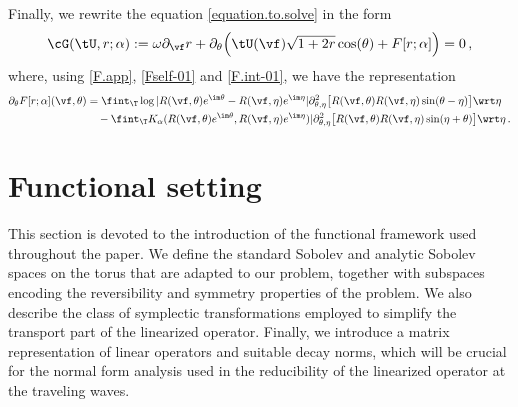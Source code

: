 \documentclass[a4paper,reqno,10pt]{article}
\newcommand{\pa}{\partial}
\begin{document}
Finally, we rewrite the equation \eqref{equation.to.solve} in the form
    \begin{align}\label{Func.G}
		\cG(\tU,r;\alpha):= \omega \pa_{\vf} r + \pa_{\theta} \Big( \tU(\vf) \sqrt{1+2 r} \cos(\theta) + F[r;\alpha] \Big)=0 \,, 
         \end{align}
         where, using \eqref{F.app}, \eqref{Fself-01} and \eqref{F.int-01}, we have the representation
         \begin{align}\label{F-compact}
\nonumber \pa_\theta F[r;\alpha] (\vf,\theta)
		& =    \fint_{\T} \log | R(\vf,\theta) e^{\im\theta} - R(\vf,\eta) e^{\im\eta} | \pa_{\theta,\eta}^2 \big[ R(\vf,\theta) R(\vf,\eta) \sin(\theta-\eta) \big] \wrt \eta 
		\\
		& \quad -  \fint_{\T} K_\alpha ( R(\vf,\theta) e^{\im\theta}, R(\vf,\eta) e^{\im\eta} )|\pa_{\theta,\eta}^2 \big[ R(\vf,\theta) R(\vf,\eta) \sin(\eta+\theta) \big] \wrt \eta\,.
\end{align}


\section{Functional setting}\label{Section-Func-sett}
This section  is devoted to the introduction of  the functional framework used throughout the paper. We define the standard Sobolev and analytic Sobolev spaces on the torus that are adapted to our problem, together with subspaces encoding the reversibility and symmetry properties of the problem. 
We also describe the class of symplectic transformations employed to simplify the transport part of the linearized operator. Finally, we introduce a matrix representation of linear operators and suitable decay norms, which will be crucial for the normal form analysis used in the reducibility of the linearized operator at the traveling waves.  
\medskip
 
\end{document}
